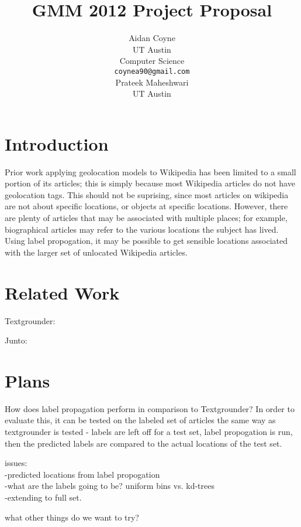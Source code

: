 \documentclass[11pt]{article}
\title{GMM 2012 Project Proposal}
\author{Aidan Coyne \\
    UT Austin\\
    Computer Science\\
  {\tt coynea90@gmail.com} \\ 
  \And
  Prateek Maheshwari\\
  UT Austin\\} %
\date{}
\begin{document}
\maketitle

\section{Introduction}
Prior work applying geolocation models to Wikipedia has been limited to a small portion of its articles;
this is simply because most Wikipedia articles do not have geolocation tags.
This should not be suprising, since most articles on wikipedia are not about specific locations, or objects at specific locations.
However, there are plenty of articles that may be associated with multiple places; for example, biographical articles may refer to the various locations the subject has lived.
Using label propogation, it may be possible to get sensible locations associated with the larger set of unlocated Wikipedia articles.

\section{Related Work}
\par Textgrounder:
\cite{rolleretal:12}

\par Junto:
\cite{talukdar:09} \cite{talukdar:10}

\section{Plans}
\par %
How does label propagation perform in comparison to Textgrounder?
In order to evaluate this, it can be tested on the labeled set of articles the same way as textgrounder is tested -
labels are left off for a test set, label propogation is run, then the predicted labels are compared to the actual locations of the test set.

\par issues:\\
-predicted locations from label propogation\\
-what are the labels going to be? uniform bins vs. kd-trees\\
-extending to full set.


what other things do we want to try?



\end{document}

